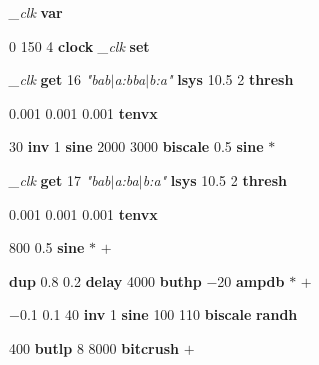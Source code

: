 \begingroup
\def \sporthfloat {} 
\def \sporthugen {\bf} 
\def \sporthword {\sl} 
\def \sporthstring {\it} 
\def \sporthcomment{\tt} 

\noindent
{\sporthword \_clk}
{\sporthugen var}

\noindent
{\sporthfloat 0}
{\sporthfloat 150}
{\sporthfloat 4}
{\sporthugen clock}
{\sporthword \_clk}
{\sporthugen set}

\noindent
{\sporthword \_clk}
{\sporthugen get}
{\sporthfloat 16}
{\sporthstring "bab$|$a:bba$|$b:a"}
{\sporthugen lsys}
{\sporthfloat 10.5}
{\sporthfloat 2}
{\sporthugen thresh}

\noindent
{\sporthfloat 0.001}
{\sporthfloat 0.001}
{\sporthfloat 0.001}
{\sporthugen tenvx}

\noindent
{\sporthfloat 30}
{\sporthugen inv}
{\sporthfloat 1}
{\sporthugen sine}
{\sporthfloat 2000}
{\sporthfloat 3000}
{\sporthugen biscale}
{\sporthfloat 0.5}
{\sporthugen sine}
{\sporthugen $*$}

\noindent
{\sporthword \_clk}
{\sporthugen get}
{\sporthfloat 17}
{\sporthstring "bab$|$a:ba$|$b:a"}
{\sporthugen lsys}
{\sporthfloat 10.5}
{\sporthfloat 2}
{\sporthugen thresh}

\noindent
{\sporthfloat 0.001}
{\sporthfloat 0.001}
{\sporthfloat 0.001}
{\sporthugen tenvx}

\noindent
{\sporthfloat 800}
{\sporthfloat 0.5}
{\sporthugen sine}
{\sporthugen $*$}
{\sporthugen $+$}

\noindent
{\sporthugen dup}
{\sporthfloat 0.8}
{\sporthfloat 0.2}
{\sporthugen delay}
{\sporthfloat 4000}
{\sporthugen buthp}
{\sporthfloat $-$20}
{\sporthugen ampdb}
{\sporthugen $*$}
{\sporthugen $+$}

\noindent
{\sporthfloat $-$0.1}
{\sporthfloat 0.1}
{\sporthcomment }
{\sporthfloat 40}
{\sporthugen inv}
{\sporthfloat 1}
{\sporthugen sine}
{\sporthfloat 100}
{\sporthfloat 110}
{\sporthugen biscale}
{\sporthugen randh}

\noindent
{\sporthfloat 400}
{\sporthugen butlp}
{\sporthfloat 8}
{\sporthfloat 8000}
{\sporthugen bitcrush}
{\sporthugen $+$}

\endgroup